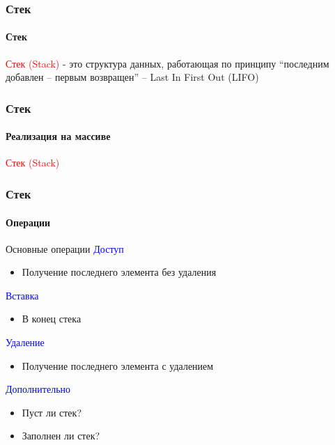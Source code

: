 \documentclass[aspectratio=169]{beamer}
\begin{document}
\begin{frame}
\frametitle{Стек}
\framesubtitle{Стек}
\justifying
\textcolor{red}{Стек (Stack)} - это структура данных, работающая по принципу “последним добавлен – первым возвращен” – Last In First Out (LIFO)

\begin{figure}
    \captionsetup[subfigure]{labelformat=empty}
    \centering
\end{figure}
\end{frame}

\begin{frame}
\frametitle{Стек}
\framesubtitle{Реализация на массиве}
\justifying
\textcolor{red}{Стек (Stack)}

\begin{figure}
    \captionsetup[subfigure]{labelformat=empty}
    \centering
\end{figure}
\end{frame}

\begin{frame}
\frametitle{Стек}
\framesubtitle{Операции}
Основные операции\newline\newline
\textcolor{blue}{Доступ}
\begin{itemize}
  \item{Получение последнего элемента без удаления}
\end{itemize}
\textcolor{blue}{Вставка}
\begin{itemize}
  \item{В конец стека}
\end{itemize}
\textcolor{blue}{Удаление}
\begin{itemize}
  \item{Получение последнего элемента с удалением}
\end{itemize}
\textcolor{blue}{Дополнительно}
\begin{itemize}
  \item{Пуст ли стек?}
  \item{Заполнен ли стек?}
\end{itemize}
\end{frame}
\end{document}
